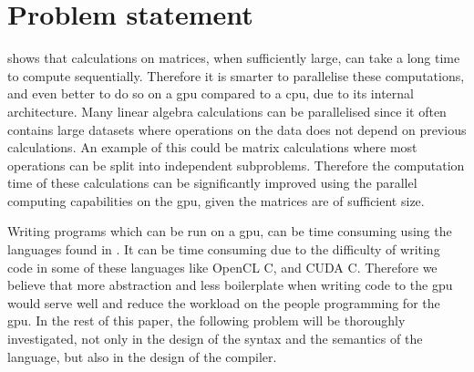 \newpage
\section{Problem statement}
\label{sec:problem}

 shows that calculations on matrices, when sufficiently large, can take a long time to compute sequentially. 
Therefore it is smarter to parallelise these computations, and even better to do so on a \acrshort{gpu} compared to a \acrshort{cpu}, due to its internal architecture. 
Many linear algebra calculations can be parallelised since it often contains large datasets where operations on the data does not depend on previous calculations. 
An example of this could be matrix calculations where most operations can be split into independent subproblems.
Therefore the computation time of these calculations can be significantly improved using the parallel computing capabilities on the \acrshort{gpu}, given the matrices are of sufficient size.

Writing programs which can be run on a \acrshort{gpu}, can be time consuming using the languages found in .
It can be time consuming due to the difficulty of writing code in some of these languages like OpenCL C, and CUDA C. 
Therefore we believe that more abstraction and less boilerplate when writing code to the \acrshort{gpu} would serve well and reduce the workload on the people programming for the \acrshort{gpu}. 
In the rest of this paper, the following problem will be thoroughly investigated, not only in the design of the syntax and the semantics of the language, but also in the design of the compiler.

